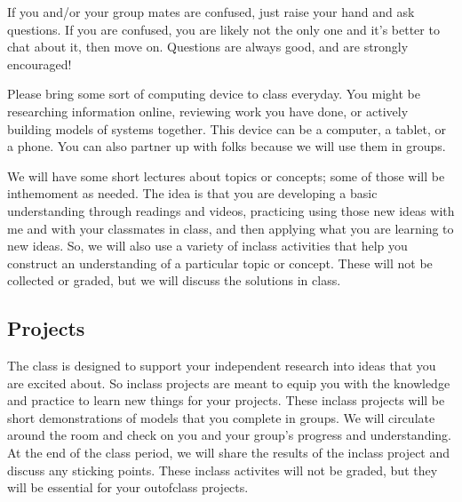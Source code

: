 \documentclass[letterpaper,10pt,english]{jupyterBook}
\begin{document}
\sphinxAtStartPar
If you and/or your group mates are confused, just raise your hand and ask questions. If you are confused, you are likely not the only one and it’s better to chat about it, then move on. Questions are always good, and are strongly encouraged! 

\sphinxAtStartPar
{} Please bring some sort of computing device to class everyday. You might be researching information online, reviewing work you have done, or actively building models of systems together. This device can be a computer, a tablet, or a phone. You can also partner up with folks because we will use them in groups. 

\sphinxAtStartPar
{} We will have some short lectures about topics or concepts; some of those will be in\sphinxhyphen{}the\sphinxhyphen{}moment as needed. The idea is that you are developing a basic understanding through readings and videos, practicing using those new ideas with me and with your classmates in class, and then applying what you are learning to new ideas. So, we will also use a variety of in\sphinxhyphen{}class activities that help you construct an understanding of a particular topic or concept. These will not be collected or graded, but we will discuss the solutions in class. 


\subsection{Projects}
\label{\detokenize{content/0_course/design:projects}}
\sphinxAtStartPar
{} The class is designed to support your independent research into ideas that you are excited about. So in\sphinxhyphen{}class projects are meant to equip you with the knowledge and practice to learn new things for your projects. These in\sphinxhyphen{}class projects will be short demonstrations of models that you complete in groups. We will circulate around the room and check on you and your group’s progress and understanding. At the end of the class period, we will share the results of the in\sphinxhyphen{}class project and discuss any sticking points. These in\sphinxhyphen{}class activites will not be graded, but they will be essential for your out\sphinxhyphen{}of\sphinxhyphen{}class projects.
\end{document}
